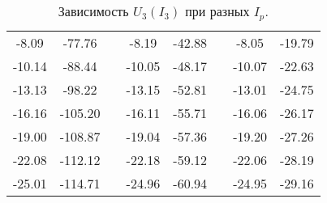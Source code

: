 \begin{table}[!]
\begin{tabular}{|c|c|c|c|c|c|c|c|}
 \\ \cline{1-2} \cline{4-5} \cline{7-8}
 -8.09 &  -77.76 & &  -8.19 & -42.88 & &  -8.05 & -19.79 
 \\ \cline{1-2} \cline{4-5} \cline{7-8}
-10.14 &  -88.44 & & -10.05 & -48.17 & & -10.07 & -22.63 
\\ \cline{1-2} \cline{4-5} \cline{7-8}
-13.13 &  -98.22 & & -13.15 & -52.81 & & -13.01 & -24.75 
\\ \cline{1-2} \cline{4-5} \cline{7-8}
-16.16 & -105.20 & & -16.11 & -55.71 & & -16.06 & -26.17 
\\ \cline{1-2} \cline{4-5} \cline{7-8}
-19.00 & -108.87 & & -19.04 & -57.36 & & -19.20 & -27.26 
\\ \cline{1-2} \cline{4-5} \cline{7-8}
-22.08 & -112.12 & & -22.18 & -59.12 & & -22.06 & -28.19 
\\ \cline{1-2} \cline{4-5} \cline{7-8}
-25.01 & -114.71 & & -24.96 & -60.94 & & -24.95 & -29.16 
\\ \cline{1-2} \cline{4-5} \cline{7-8}
\end{tabular}
\caption{Зависимость $U_3(I_3)$ при разных $I_p$.}
\end{table} 
 

 













 





